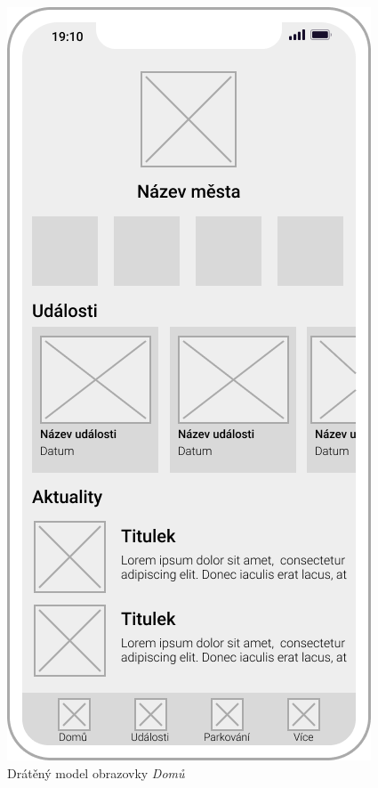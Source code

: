 \begin{minipage}[t]{0.45\textwidth}
  \begin{figure}[H]
    \centering
    \includegraphics[width=.7\textwidth]{home_wireframe.png}
    \caption{Drátěný model obrazovky \textit{Domů}}
    \label{fig:wireframe1}
  \end{figure}
  \begin{figure}[H]
    \centering

\end{figure}
\end{minipage}

